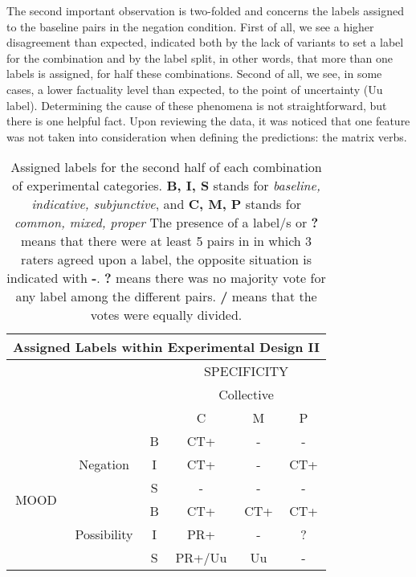 The second important observation is two-folded and concerns the labels assigned to the baseline pairs in the negation condition. First of all, we see a higher disagreement than expected, indicated both by the lack of variants to set a label for the combination and by the label split, in other words, that more than one labels is assigned, for half these combinations. Second of all, we see, in some cases, a lower factuality level than expected, to the point of uncertainty (Uu label). Determining the cause of these phenomena is not straightforward, but there is one helpful fact. Upon reviewing the data, it was noticed that one feature was not taken into consideration when defining the predictions: the matrix verbs.\\

\begin{table}[h!]
\centering
\begin{tabular}{|c|c|c|c|c|c|}
\hline
\multicolumn{6}{|c|}{Assigned Labels within Experimental Design II}\\\hline
                      & & &\multicolumn{3}{c|}{SPECIFICITY} \\\cline{4-6} 
                      & & &\multicolumn{3}{c|}{Collective}\\\cline{4-6} 
                      & & & C & M & P \\\hline 
\multirow{6}{*}{MOOD} & \multirow{3}{*}{Negation} & B & CT+ & - & - \\\cline{3-6}
                      &                           & I & CT+ & - & CT+ \\\cline{3-6}
                      &                           & S & - & - & - \\ \cline{2-6}                     
                      &\multirow{3}{*}{Possibility}& B & CT+ & CT+ & CT+\\\cline{3-6}
                      &                           & I & PR+ & - & ?\\\cline{3-6}
                      &                           & S & PR+/Uu & Uu & - \\\hline                                                          
\end{tabular}
\caption[Assigned labels II.]{Assigned labels for the second half of each combination of experimental categories. \textbf{B, I, S} stands for \textit{baseline, indicative, subjunctive}, and \textbf{C, M, P} stands for \textit{common, mixed, proper} The presence of a label/s or \textbf{?} means that there were at least 5 pairs in in which 3 raters agreed upon a label, the opposite situation is indicated with \textbf{-}. \textbf{?} means there was no majority vote for any label among the different pairs. \textbf{/} means that the votes were equally divided.}
\label{tab:ass2}
\end{table}

